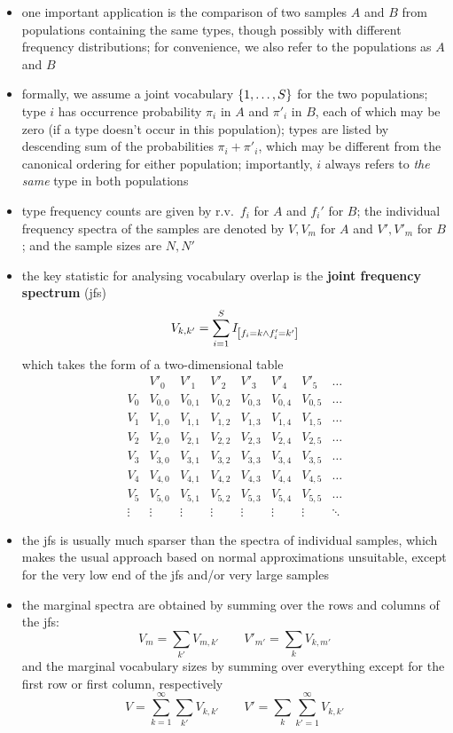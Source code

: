 \documentclass[a4paper]{article}
\begin{document}
\begin{itemize}
\item one important application is the comparison of two samples $A$ and $B$ from populations containing the same types, though possibly with different frequency distributions; for convenience, we also refer to the populations as $A$ and $B$
\item formally, we assume a joint vocabulary $\left\{1, \dots, S\right\}$ for the two populations; type $i$ has occurrence probability $\pi_i$ in $A$ and $\pi'_i$ in $B$, each of which may be zero (if a type doesn't occur in this population); types are listed by descending sum of the probabilities $\pi_i + \pi'_i$, which may be different from the canonical ordering for either population; importantly, $i$ always refers to \emph{the same} type in both populations
\item type frequency counts are given by r.v.\ $f_i$ for $A$ and $f_i'$ for $B$; the individual frequency spectra of the samples are denoted by $V, V_m$ for $A$ and $V', V'_m$ for $B$; and the sample sizes are $N, N'$
\item the key statistic for analysing vocabulary overlap is the \textbf{joint frequency spectrum} (jfs)
  \[
    V_{k,k'} = \sum_{i=1}^{S} I_{\left[f_i = k \wedge f'_i = k'\right]}
  \]
  which takes the form of a two-dimensional table
  \[
    \begin{array}{c|ccccccc}
      & V'_0 & V'_1 & V'_2 & V'_3 & V'_4 & V'_5 & \ldots\\
      \hline
      V_0 & V_{0,0} & V_{0,1} & V_{0,2} & V_{0,3} & V_{0,4} & V_{0,5} & \ldots \\
      V_1 & V_{1,0} & V_{1,1} & V_{1,2} & V_{1,3} & V_{1,4} & V_{1,5} & \ldots \\
      V_2 & V_{2,0} & V_{2,1} & V_{2,2} & V_{2,3} & V_{2,4} & V_{2,5} & \ldots \\
      V_3 & V_{3,0} & V_{3,1} & V_{3,2} & V_{3,3} & V_{3,4} & V_{3,5} & \ldots \\
      V_4 & V_{4,0} & V_{4,1} & V_{4,2} & V_{4,3} & V_{4,4} & V_{4,5} & \ldots \\
      V_5 & V_{5,0} & V_{5,1} & V_{5,2} & V_{5,3} & V_{5,4} & V_{5,5} & \ldots \\
      \vdots & \vdots & \vdots & \vdots & \vdots & \vdots & \vdots & \ddots
    \end{array}
  \]
\item the jfs is usually much sparser than the spectra of individual samples, which makes the usual approach based on normal approximations unsuitable, except for the very low end of the jfs and/or very large samples
\item the marginal spectra are obtained by summing over the rows and columns of the jfs:
  \[
    V_m = \sum_{k'} V_{m,k'} \qquad
    V'_{m'} = \sum_{k} V_{k,m'}
  \]
  and the marginal vocabulary sizes by summing over everything except for the first row or first column, respectively
  \[
    V = \sum_{k=1}^{\infty} \sum_{k'} V_{k,k'} \qquad
    V' = \sum_{k} \sum_{k'=1}^{\infty} V_{k,k'}
  \]
  

\end{itemize}
\end{document}
